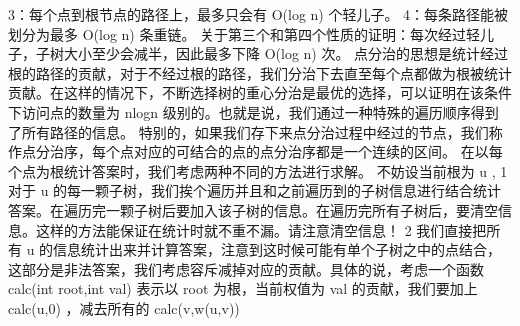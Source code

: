 {}3：每个点到根节点的路径上，最多只会有 \markdownRendererDollarSign{}O(\markdownRendererBackslash{}log n)\markdownRendererDollarSign{} 个轻儿子。\markdownRendererHardLineBreak
{}4：每条路径能被划分为最多 \markdownRendererDollarSign{}O(\markdownRendererBackslash{}log n)\markdownRendererDollarSign{} 条重链。\markdownRendererParagraphSeparator
{}关于第三个和第四个性质的证明：每次经过轻儿子，子树大小至少会减半，因此最多下降 \markdownRendererDollarSign{}O(\markdownRendererBackslash{}log n)\markdownRendererDollarSign{} 次。\markdownRendererInterblockSeparator
{}\markdownRendererInterblockSeparator
{}
\markdownRendererSectionEnd \markdownRendererSectionBegin
{}\markdownRendererInterblockSeparator
{}点分治的思想是统计经过根的路径的贡献，对于不经过根的路径，我们分治下去直至每个点都做为根被统计贡献。在这样的情况下，不断选择树的重心分治是最优的选择，可以证明在该条件下访问点的数量为\markdownRendererDollarSign{} nlogn \markdownRendererDollarSign{}级别的。也就是说，我们通过一种特殊的遍历顺序得到了所有路径的信息。\markdownRendererParagraphSeparator
{}特别的，如果我们存下来点分治过程中经过的节点，我们称作点分治序，每个点对应的可结合的点的点分治序都是一个连续的区间。\markdownRendererParagraphSeparator
{}在以每个点为根统计答案时，我们考虑两种不同的方法进行求解。\markdownRendererParagraphSeparator
{}不妨设当前根为\markdownRendererDollarSign{} u \markdownRendererDollarSign{},\markdownRendererParagraphSeparator
{}\markdownRendererDollarSign{} 1 \markdownRendererDollarSign{}对于\markdownRendererDollarSign{} u \markdownRendererDollarSign{}的每一颗子树，我们挨个遍历并且和之前遍历到的子树信息进行结合统计答案。在遍历完一颗子树后要加入该子树的信息。在遍历完所有子树后，要清空信息。这样的方法能保证在统计时就不重不漏。请注意清空信息！\markdownRendererParagraphSeparator
{}\markdownRendererDollarSign{} 2 \markdownRendererDollarSign{}我们直接把所有\markdownRendererDollarSign{} u \markdownRendererDollarSign{}的信息统计出来并计算答案，注意到这时候可能有单个子树之中的点结合，这部分是非法答案，我们考虑容斥减掉对应的贡献。具体的说，考虑一个函数\markdownRendererDollarSign{} calc(int\markdownRendererBackslash{} root,int\markdownRendererBackslash{} val) \markdownRendererDollarSign{}表示以\markdownRendererDollarSign{} root \markdownRendererDollarSign{}为根，当前权值为\markdownRendererDollarSign{} val \markdownRendererDollarSign{}的贡献，我们要加上\markdownRendererDollarSign{} calc(u,0) \markdownRendererDollarSign{}，减去所有的\markdownRendererDollarSign{} calc(v,w(u,v)) \markdownRendererDollarSign{}\markdownRendererInterblockSeparator
